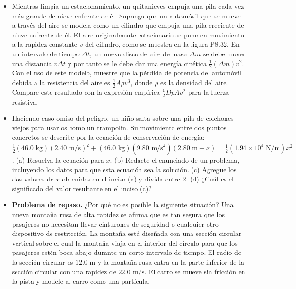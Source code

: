\documentclass[11pt,a4paper]{article}
\begin{document}
\begin{itemize}
    \item[\textbf{32.}] Mientras limpia un estacionamiento, un quitanieves empuja una pila cada vez más grande de nieve enfrente de él. Suponga que un automóvil que se mueve a través del aire se modela como un cilindro que empuja una pila creciente de nieve enfrente de él. El aire originalmente estacionario se pone en movimiento a la rapidez constante $v$ del cilindro, como se muestra en la figura P8.32. En un intervalo de tiempo $\Delta t$, un nuevo disco de aire de masa $\Delta m$ se debe mover una distancia $v\Delta t$ y por tanto se le debe dar una energía cinética $\frac{1}{2}(\Delta m)v^2$. Con el uso de este modelo, muestre que la pérdida de potencia del automóvil debida a la resistencia del aire es $\frac{1}{2}A \rho v^3$, donde $\rho$ es la densidad del aire. Compare este resultado con la expresión empírica $\frac{1}{2}DpAv^2$ para la fuerza resistiva.
    \vspace*{6cm}

    \item[\textbf{33.}] Haciendo caso omiso del peligro, un niño salta sobre una pila de colchones viejos para usarlos como un trampolín. Su movimiento entre dos puntos concretos se describe por la ecuación de conservación de energía: $\frac{1}{2}(46.0 \text{ kg})(2.40 \text{ m/s})^2 + (46.0 \text{ kg})(9.80 \text{ m/s}^2)(2.80 \text{ m} + x) = \frac{1}{2}(1.94 \times 10^4 \text{ N/m})x^2$. (a) Resuelva la ecuación para $x$. (b) Redacte el enunciado de un problema, incluyendo los datos para que esta ecuación sea la solución. (c) Agregue los dos valores de $x$ obtenidos en el inciso (a) y divida entre 2. (d) ¿Cuál es el significado del valor resultante en el inciso (c)?
    \vspace*{6cm}

    \item[\textbf{34.}] \textbf{Problema de repaso.} ¿Por qué no es posible la siguiente situación? Una nueva montaña rusa de alta rapidez se afirma que es tan segura que los pasajeros no necesitan llevar cinturones de seguridad o cualquier otro dispositivo de restricción. La montaña está diseñada con una sección circular vertical sobre el cual la montaña viaja en el interior del círculo para que los pasajeros estén boca abajo durante un corto intervalo de tiempo. El radio de la sección circular es $12.0 \text{ m}$ y la montaña rusa entra en la parte inferior de la sección circular con una rapidez de $22.0 \text{ m/s}$. El carro se mueve sin fricción en la pista y modele al carro como una partícula.
    \vspace*{6cm}


\end{itemize}
\end{document}

